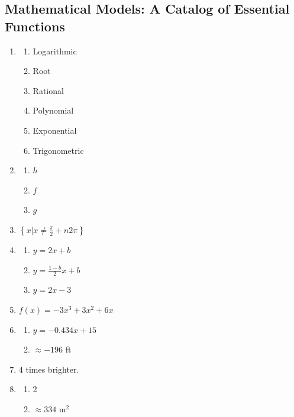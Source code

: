 \documentclass{article}
\begin{document}
\subsection{Mathematical Models: A Catalog of Essential Functions}
\begin{enumerate}
  \item \begin{enumerate}[label=(\alph*)]
          \item Logarithmic
          \item Root
          \item Rational
          \item Polynomial
          \item Exponential
          \item Trigonometric
        \end{enumerate}
        \setcounter{enumi}{2}
  \item \begin{enumerate}[label=(\alph*)]
          \item $h$
          \item $f$
          \item $g$
        \end{enumerate}
        \setcounter{enumi}{4}
  \item $\left\{x | x \ne \frac{\pi}{2} + n2\pi\right\}$
        \setcounter{enumi}{6}
  \item \begin{enumerate}[label=(\alph*)]
          \item $y = 2x + b$
          \item $y = \frac{1-b}{2}x + b$
          \item $y = 2x - 3$
        \end{enumerate}
        \setcounter{enumi}{10}
  \item $f(x) = -3x^3+3x^2+6x$
        \setcounter{enumi}{18}
  \item \begin{enumerate}[label=(\alph*)]
          \item $y = -0.434x + 15$
          \item $\approx -196$ ft
        \end{enumerate}
        \setcounter{enumi}{28}
  \item 4 times brighter.
  \item \begin{enumerate}[label=(\alph*)]
          \item 2
          \item $\approx 334$ $\text{m}^2$
        \end{enumerate}
\end{enumerate}
\end{document}
